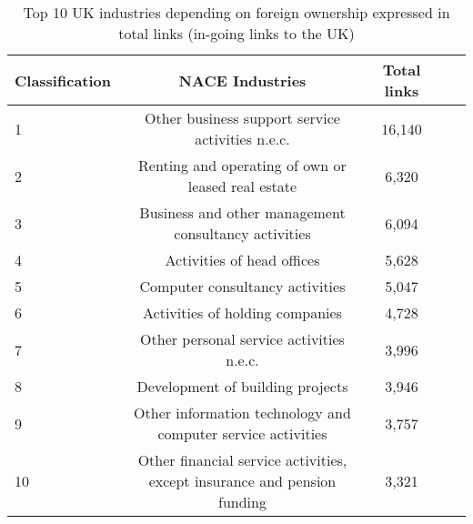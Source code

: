 \begin{table}[!ht]
\begin{adjustwidth}{-2.25in}{0in}
\caption{Top 10 UK industries depending on foreign ownership expressed in total links (in-going links to the UK)\label{tab:uk_ingoinglinks}}
\centering
\medskip
\begin{tabular}{|l|c|c|c|c|}
\hline
Classification  & NACE Industries & Total links \\ 
\hline
1 &      Other business support service activities n.e.c. &   16,140  \\
\hline
2 & Renting and operating of own or leased real estate  &  6,320  \\
\hline
3 & Business and other management consultancy activities &  6,094  \\
\hline
4 &  Activities of head offices &   5,628  \\
\hline
5 &  Computer consultancy activities &   5,047  \\
\hline
6 &  Activities of holding companies &  4,728  \\
\hline
7 &  Other personal service activities n.e.c. &  3,996 \\
\hline
8 &  Development of building projects &  3,946 \\
\hline
9 &  Other information technology and computer service activities &  3,757 \\
\hline
10 &  Other financial service activities, except insurance and pension funding  &  3,321 \\
\hline
\end{tabular}
\end{adjustwidth}
\end{table}



%